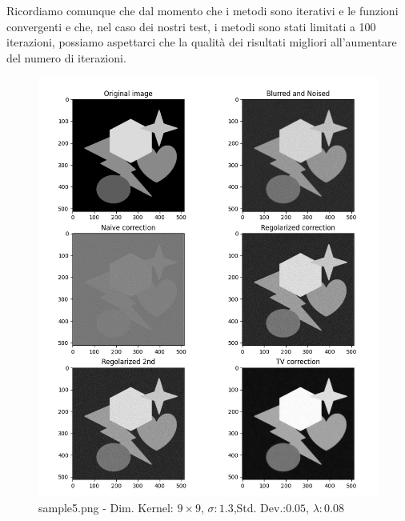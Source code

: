 \documentclass[12pt]{article}
\begin{document}
    Ricordiamo comunque che dal momento che i metodi sono iterativi e le funzioni convergenti e che, nel caso dei nostri test, i metodi sono stati limitati a 100 iterazioni, possiamo aspettarci che la qualità dei risultati migliori all'aumentare del numero di iterazioni.
    
    \newpage
    \begin{figure}[h!]
    \includegraphics[width=14cm]{sample5}
    \caption{sample5.png - Dim. Kernel: $9\times9$, $\sigma:1.3$,Std. Dev.:$0.05$, $\lambda:0.08$}
    \end{figure}
    \newpage
\end{document}
